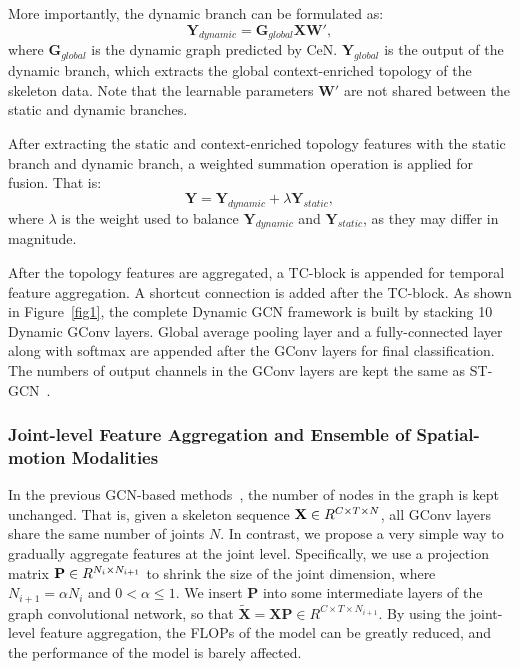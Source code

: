 \documentclass[sigconf]{acmart}
\begin{document}
More importantly, the dynamic branch can be formulated as:
\begin{equation}
{{\mathbf{Y}}_{dynamic}} = {{\mathbf{G}}_{global}}{{\mathbf{X}}}{\mathbf{W'}},
\label{eq3}
\end{equation}
where ${{\mathbf{G}}_{global}}$ is the dynamic graph predicted by CeN. ${{\mathbf{Y}}_{global}}$ is the output of the dynamic branch, which extracts the global context-enriched topology of the skeleton data. Note that the learnable parameters $\mathbf{W'}$ are not shared between the static and dynamic branches.

After extracting the static and context-enriched topology features with the static branch and dynamic branch, a weighted summation operation is applied for fusion. That is:
\begin{equation}
{{\mathbf{Y}}} ={{\mathbf{Y}}_{dynamic}} +  \lambda{{\mathbf{Y}}_{static}},
 \label{eq4}
\end{equation}
where $\lambda$ is the weight used to balance ${{\mathbf{Y}}_{dynamic}}$ and ${{\mathbf{Y}}_{static}}$, as they may differ in magnitude.

After the topology features are aggregated, a TC-block is appended for temporal feature aggregation. A shortcut connection is added after the TC-block. As shown in Figure~\ref{fig1}, the complete Dynamic GCN framework is built by stacking 10 Dynamic GConv layers. Global average pooling layer and a fully-connected layer along with softmax are appended after the GConv layers for final classification. The numbers of output channels in the GConv layers are kept the same as ST-GCN~\cite{yanspatial}.

\subsubsection{Joint-level Feature Aggregation and Ensemble of Spatial-motion Modalities}

In the previous GCN-based methods~\cite{yanspatial,shi2019two,shi2019}, the number of nodes in the graph is kept unchanged. That is, given a skeleton sequence ${\bf{X}} \in {R^{C \times T \times N}}$, all GConv layers share the same number of joints $N$. In contrast, we propose a very simple way to gradually aggregate features at the joint level. Specifically, we use a projection matrix ${\bf{P}} \in {R^{N_i \times N_{i+1}}}$ to shrink the size of the joint dimension, where $N_{i+1} = \alpha N_i$ and $0 < \alpha  \leq 1$. We insert $\mathbf{P}$ into some intermediate layers of the graph convolutional network, so that $\widetilde {\mathbf{X}} = {\mathbf{X}} {\mathbf{P}} \in {R^{C \times T \times N_{i+1}}}$. By using the joint-level feature aggregation, the FLOPs of the model can be greatly reduced, and the performance of the model is barely affected.
\end{document}

